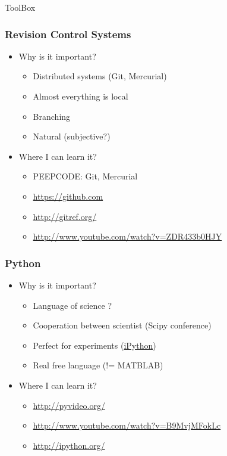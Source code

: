 \documentclass[fleqn]{beamer}
\begin{document}
\begin{section}{ToolBox}
  \begin{frame}\frametitle{Revision Control Systems}
  \begin{itemize}
    \item{Why is it important?}
      \begin{itemize}
      \item Distributed systems (Git, Mercurial)
      \item Almost everything is local
      \item Branching
      \item Natural (subjective?)
      \end{itemize}
    \item{Where I can learn it?}
      \begin{itemize}
        \item PEEPCODE: Git, Mercurial
        \item \url{https://github.com}
        \item \url{http://gitref.org/}
        \item \url{http://www.youtube.com/watch?v=ZDR433b0HJY}

      \end{itemize}
  \end{itemize}
  \end{frame}


  \begin{frame}\frametitle{Python}
  \begin{itemize}
    \item{Why is it important?}
      \begin{itemize}
      \item Language of science ? 
      \item Cooperation between scientist (Scipy conference)
      \item Perfect for experiments (\href{http://ipython.org/ipython-doc/rel-0.12/_static/notebook_specgram.png}{iPython})
      \item Real free language (!= MATBLAB)

      \end{itemize}
    \item{Where I can learn it?}
      \begin{itemize}
      \item \url{http://pyvideo.org/}
      \item \url{http://www.youtube.com/watch?v=B9MvjMFokLc}
      \item \url{http://ipython.org/}


\end{itemize}
\end{itemize}
\end{frame}
\end{section}
\end{document}

